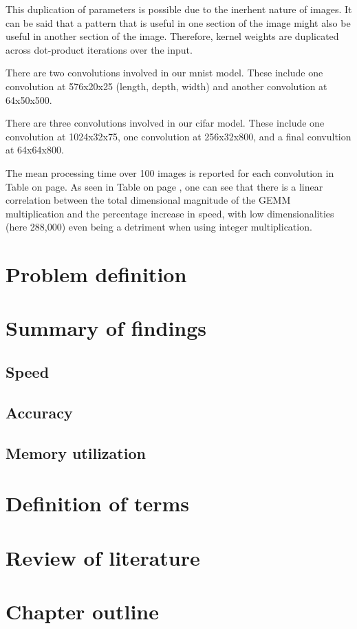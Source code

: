 This duplication of parameters is possible due to the inerhent nature of images. It can be said that a pattern that is useful in one section of the image might also be useful in another section of the image. Therefore, kernel weights are duplicated across dot-product iterations over the input.

There are two convolutions involved in our mnist model. These include one convolution at 576x20x25 (length, depth, width) and another convolution at 64x50x500.

There are three convolutions involved in our cifar model. These include one convolution at 1024x32x75, one convolution at 256x32x800, and a final convultion at 64x64x800.

The mean processing time over 100 images is reported for each convolution in Table on page. As seen in Table on page , one can see that there is a linear correlation between the total dimensional magnitude of the GEMM multiplication and the percentage increase in speed, with low dimensionalities (here 288,000) even being a detriment when using integer multiplication.

\section{Problem definition}
\section{Summary of findings}
\subsection{Speed}
\subsection{Accuracy}
\subsection{Memory utilization}

\section{Definition of terms}
\section{Review of literature}
\section{Chapter outline}
